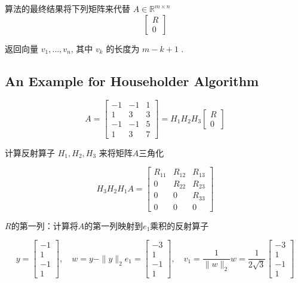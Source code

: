    

算法的最终结果将下列矩阵来代替 $ A\in \mathbb{R}^{m \times n}  $
$$
\left[\begin{array}{c}
R \\
0
\end{array}\right]
$$

返回向量 $ v_{1}, \ldots, v_{n} $, 其中 $ v_{k} $ 的长度为 $ m-k+1 $ .



\subsection{An Example for Householder Algorithm}

\begin{problem}
    $$ A=\left[\begin{array}{rrr}-1 & -1 & 1 \\ 1 & 3 & 3 \\ -1 & -1 & 5 \\ 1 & 3 & 7\end{array}\right]=H_{1} H_{2} H_{3}\left[\begin{array}{l}R \\ 0\end{array}\right] $$

    计算反射算子 $ H_{1}, H_{2}, H_{3} $ 来将矩阵$A$三角化

    $$ H_{3} H_{2} H_{1} A=\left[\begin{array}{ccc}R_{11} & R_{12} & R_{13} \\ 0 & R_{22} & R_{23} \\ 0 & 0 & R_{33} \\ 0 & 0 & 0\end{array}\right] $$

    $R$的第一列：计算将$A$的第一列映射到$e_1$乘积的反射算子

    $$
y=\left[\begin{array}{r}
-1 \\
1 \\
-1 \\
1
\end{array}\right], \quad w=y-\|y\|_{2} e_{1}=\left[\begin{array}{r}
-3 \\
1 \\
-1 \\
1
\end{array}\right], \quad v_{1}=\frac{1}{\|w\|_{2}} w=\frac{1}{2 \sqrt{3}}\left[\begin{array}{r}
-3 \\
1 \\
-1 \\
1
\end{array}\right]
$$


\end{problem}
